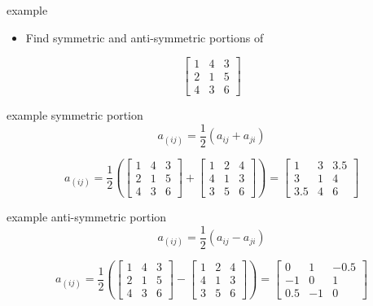 \documentclass[
  letterpaper,
  ignorenonframetext,
  aspectratio=43,
  handout,
  12pt]{beamer}
\providecommand{\tightlist}{%
  \setlength{\itemsep}{0pt}\setlength{\parskip}{0pt}}
\providecommand{\tightlist}{%
\setlength{\itemsep}{0pt}\setlength{\parskip}{0pt}}
\begin{document}
\begin{frame}{example}
\protect\hypertarget{example}{}
\begin{itemize}
\tightlist
\item
  Find symmetric and anti-symmetric portions of
\end{itemize}

\[\begin{bmatrix}
1 & 4 & 3\\
2 & 1 & 5\\
4 & 3 & 6
\end{bmatrix}\]
\end{frame}

\begin{frame}{example symmetric portion}
\protect\hypertarget{example-symmetric-portion}{}
\[a_{(ij)} = \frac{1}{2}(a_{ij} + a_{ji})\]

\[a_{(ij)} = \frac{1}{2} \left (
\begin{bmatrix}
1 & 4 & 3\\
2 & 1 & 5\\
4 & 3 & 6
\end{bmatrix}+
\begin{bmatrix}
1 & 2 & 4\\
4 & 1 & 3\\
3 & 5 & 6
\end{bmatrix}\right)
= \begin{bmatrix}
1 & 3 & 3.5\\
3 & 1 & 4\\
3.5 & 4 & 6
\end{bmatrix}\]
\end{frame}

\begin{frame}{example anti-symmetric portion}
\protect\hypertarget{example-anti-symmetric-portion}{}
\[a_{(ij)} = \frac{1}{2}(a_{ij} - a_{ji})\]

\[a_{(ij)} = \frac{1}{2} \left (
\begin{bmatrix}
1 & 4 & 3\\
2 & 1 & 5\\
4 & 3 & 6
\end{bmatrix}-
\begin{bmatrix}
1 & 2 & 4\\
4 & 1 & 3\\
3 & 5 & 6
\end{bmatrix}\right)
= \begin{bmatrix}
0 & 1 & -0.5\\
-1 & 0 & 1\\
0.5 & -1 & 0
\end{bmatrix}\]
\end{frame}
\end{document}
